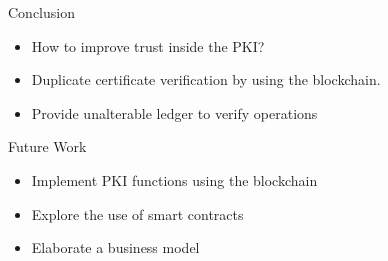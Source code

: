 \begin{frame}{Conclusion}

\begin{itemize}

\item How to improve trust inside the PKI?

\item Duplicate certificate verification by using the blockchain.

\item Provide unalterable ledger to verify operations

\end{itemize}

\end{frame}

\begin{frame}{Future Work}

\begin{itemize}

\item Implement PKI functions using the blockchain

\item Explore the use of smart contracts

\item Elaborate a business model

\end{itemize}

\end{frame}
